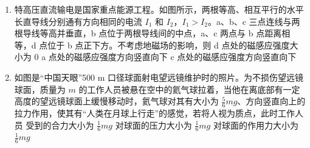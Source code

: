 \documentclass[\gkver]{gaokaozhenti}
\begin{document}
\begin{enumerate}
{B．a、b 两点电场强度大小相同，方向不同，则 a、b 两点电场强度不同，B 错误；

C．从 Q 到 P 电势逐渐降低，则 $\varphi_{b}>\varphi_{d}$，C 错误；

D．由 $\varphi_{a}>\varphi_{c}$，负电荷从 a 到 c 电场力做负功，电势能增加，D 正确。

故选 D。
}

\item
特高压直流输电是国家重点能源工程。如图所示，两根等高、相互平行的水平长直导线分别通有方向相同的电流 $I_{1}$ 和 $I_{2}$，$I_{1}>I_{2}$。a、b、c 三点连线与两根导线等高并垂直，b 点位于两根导线间的中点，a、c 两点与 b 点距离相等，d 点位于 b 点正下方。不考虑地磁场的影响，则
{d 点处的磁感应强度大小为 0}
{a 点处的磁感应强度方向竖直向下}
{c 点处的磁感应强度方向竖直向下}

\item
如图是“中国天眼”500 m 口径球面射电望远镜维护时的照片。为不损伤望远镜球面，质量为 $m$ 的工作人员被悬在空中的氦气球拉着，当他在离底部有一定高度的望远镜球面上缓慢移动时，氦气球对其有大小为 $\frac{5}{6}mg$、方向竖直向上的拉力作用，使其有“人类在月球上行走”的感觉，若将人视为质点，此时工作人员
{受到的合力大小为 $\frac{1}{6}mg$}
{对球面的压力大小为 $\frac{1}{6}mg$}
{对球面的作用力大小为 $\frac{1}{6}mg$}
\end{enumerate}
\end{document}
